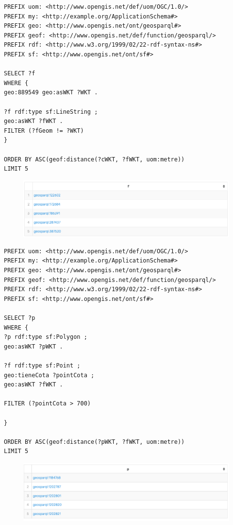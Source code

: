 \begin{lstlisting}
PREFIX uom: <http://www.opengis.net/def/uom/OGC/1.0/>
PREFIX my: <http://example.org/ApplicationSchema#>
PREFIX geo: <http://www.opengis.net/ont/geosparql#>
PREFIX geof: <http://www.opengis.net/def/function/geosparql/>
PREFIX rdf: <http://www.w3.org/1999/02/22-rdf-syntax-ns#>
PREFIX sf: <http://www.opengis.net/ont/sf#>

SELECT ?f
WHERE {
geo:889549 geo:asWKT ?WKT .

?f rdf:type sf:LineString ;
geo:asWKT ?fWKT .
FILTER (?fGeom != ?WKT)
}

ORDER BY ASC(geof:distance(?cWKT, ?fWKT, uom:metre))
LIMIT 5
\end{lstlisting}

\begin{figure}[H]
	\centering
	\includegraphics[width=0.7\linewidth]{imagenes/capitulo4/salida10}
	\caption{}
	\label{fig:salida10}
\end{figure}

\begin{lstlisting}
PREFIX uom: <http://www.opengis.net/def/uom/OGC/1.0/>
PREFIX my: <http://example.org/ApplicationSchema#>
PREFIX geo: <http://www.opengis.net/ont/geosparql#>
PREFIX geof: <http://www.opengis.net/def/function/geosparql/>
PREFIX rdf: <http://www.w3.org/1999/02/22-rdf-syntax-ns#>
PREFIX sf: <http://www.opengis.net/ont/sf#>

SELECT ?p
WHERE {
?p rdf:type sf:Polygon ;
geo:asWKT ?pWKT .

?f rdf:type sf:Point ;
geo:tieneCota ?pointCota ;
geo:asWKT ?fWKT .

FILTER (?pointCota > 700)

}

ORDER BY ASC(geof:distance(?pWKT, ?fWKT, uom:metre))
LIMIT 5
\end{lstlisting}

\begin{figure}[H]
	\centering
	\includegraphics[width=0.7\linewidth]{imagenes/capitulo4/salida11}
	\caption{}
	\label{fig:salida11}
\end{figure}



